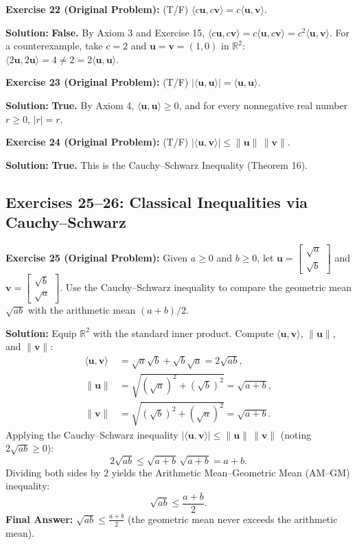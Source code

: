 \documentclass[11pt, letterpaper]{article}
\theoremstyle{definition}
\theoremstyle{remark}
\begin{document}
\textbf{Exercise 22 (Original Problem):} (T/F) $\langle c\mathbf{u}, c\mathbf{v} \rangle = c\langle \mathbf{u}, \mathbf{v} \rangle$.

\textbf{Solution:} \textbf{False.} By Axiom 3 and Exercise 15, $\langle c\mathbf{u}, c\mathbf{v} \rangle = c\langle \mathbf{u}, c\mathbf{v} \rangle = c^2 \langle \mathbf{u}, \mathbf{v} \rangle$. For a counterexample, take $c = 2$ and $\mathbf{u} = \mathbf{v} = (1, 0)$ in $\mathbb{R}^2$: $\langle 2\mathbf{u}, 2\mathbf{u} \rangle = 4 \ne 2 = 2\langle \mathbf{u}, \mathbf{u} \rangle$.

\textbf{Exercise 23 (Original Problem):} (T/F) $|\langle \mathbf{u}, \mathbf{u} \rangle| = \langle \mathbf{u}, \mathbf{u} \rangle$.

\textbf{Solution:} \textbf{True.} By Axiom 4, $\langle \mathbf{u}, \mathbf{u} \rangle \ge 0$, and for every nonnegative real number $r \ge 0$, $|r| = r$.

\textbf{Exercise 24 (Original Problem):} (T/F) $|\langle \mathbf{u}, \mathbf{v} \rangle| \le \|\mathbf{u}\|\,\|\mathbf{v}\|$.

\textbf{Solution:} \textbf{True.} This is the Cauchy--Schwarz Inequality (Theorem 16).

\subsection{Exercises 25--26: Classical Inequalities via Cauchy--Schwarz}

\textbf{Exercise 25 (Original Problem):} Given $a \ge 0$ and $b \ge 0$, let $\mathbf{u} = \begin{bmatrix} \sqrt{a} \\ \sqrt{b} \end{bmatrix}$ and $\mathbf{v} = \begin{bmatrix} \sqrt{b} \\ \sqrt{a} \end{bmatrix}$. Use the Cauchy--Schwarz inequality to compare the geometric mean $\sqrt{ab}$ with the arithmetic mean $(a+b)/2$.

\textbf{Solution:}
Equip $\mathbb{R}^2$ with the standard inner product. Compute $\langle \mathbf{u}, \mathbf{v} \rangle$, $\|\mathbf{u}\|$, and $\|\mathbf{v}\|$:
\begin{align*}
    \langle \mathbf{u}, \mathbf{v} \rangle &= \sqrt{a}\sqrt{b} + \sqrt{b}\sqrt{a} = 2\sqrt{ab}, \\
    \|\mathbf{u}\| &= \sqrt{(\sqrt{a})^2 + (\sqrt{b})^2} = \sqrt{a + b}, \\
    \|\mathbf{v}\| &= \sqrt{(\sqrt{b})^2 + (\sqrt{a})^2} = \sqrt{a + b}.
\end{align*}
Applying the Cauchy--Schwarz inequality $|\langle \mathbf{u}, \mathbf{v} \rangle| \le \|\mathbf{u}\|\,\|\mathbf{v}\|$ (noting $2\sqrt{ab} \ge 0$):
\[
    2\sqrt{ab} \le \sqrt{a+b}\,\sqrt{a+b} = a + b.
\]
Dividing both sides by $2$ yields the Arithmetic Mean--Geometric Mean (AM--GM) inequality:
\[
    \sqrt{ab} \le \frac{a+b}{2}.
\]
\textbf{Final Answer:} $\displaystyle \sqrt{ab} \le \frac{a+b}{2}$ (the geometric mean never exceeds the arithmetic mean).
\end{document}

